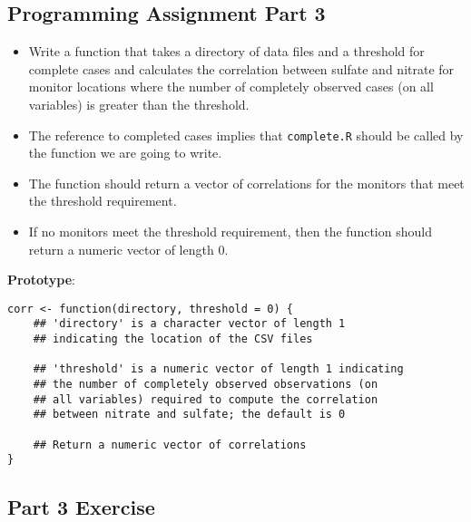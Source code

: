 \documentclass[12pt]{article}
\begin{document}
 
\subsection{Programming Assignment Part 3 }
\begin{itemize}

\item Write a function that takes a directory of data files and a threshold for complete cases and calculates the correlation between sulfate and nitrate for monitor locations where the number of completely observed cases (on all variables) is greater than the threshold. \item The reference to completed cases implies that \texttt{complete.R} should be called by the function we are going to write. \item The function should return a vector of correlations for the monitors that meet the threshold requirement. \item If no monitors meet the threshold requirement, then the function should return a numeric vector of length 0.
\end{itemize}

\textbf{Prototype}: 
\begin{framed}
\begin{verbatim}
corr <- function(directory, threshold = 0) {
    ## 'directory' is a character vector of length 1 
    ## indicating the location of the CSV files

    ## 'threshold' is a numeric vector of length 1 indicating
    ## the number of completely observed observations (on 
    ## all variables) required to compute the correlation 
    ## between nitrate and sulfate; the default is 0

    ## Return a numeric vector of correlations
}
\end{verbatim}
\end{framed}
\newpage
\subsection{Part 3 Exercise}
\end{document}
